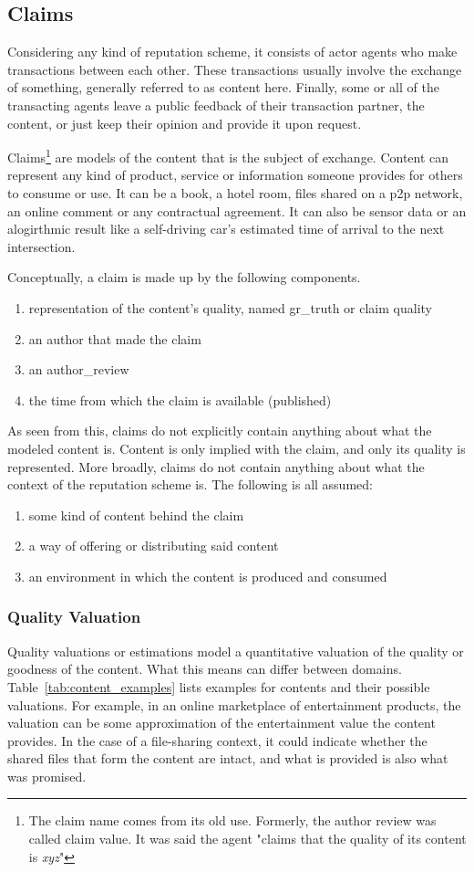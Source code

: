 \documentclass[%
    ]{\PathToTumTemplate/thesis/tum_thesis}
\begin{document}
\subsection{Claims}
Considering any kind of reputation scheme, it consists of actor agents who make transactions between each other.
These transactions usually involve the exchange of something, generally referred to as content here.
Finally, some or all of the transacting agents leave a public feedback of their transaction partner, the content, or just keep their opinion and provide it upon request.

Claims\footnote{The claim name comes from its old use. Formerly, the author review was called claim value. It was said the agent "claims that the quality of its content is \emph{xyz}"} are models of the content that is the subject of exchange.
Content can represent any kind of product, service or information someone provides for others to consume or use.
It can be a book, a hotel room, files shared on a \acrlong{p2p} network, an online comment or any contractual agreement.
It can also be sensor data or an alogirthmic result like a self-driving car's estimated time of arrival to the next intersection.

Conceptually, a claim is made up by the following components.
\begin{enumerate}
	\item representation of the content's quality, named \gls{gr_truth} or claim quality
	\item an author that made the claim
	\item an \gls{author_review}
	\item the time from which the claim is available (published)
\end{enumerate}

As seen from this, claims do not explicitly contain anything about what the modeled content is.
Content is only implied with the claim, and only its quality is represented.
More broadly, claims do not contain anything about what the context of the reputation scheme is.
The following is all assumed:
\begin{enumerate}
	\item some kind of content behind the claim
	\item a way of offering or distributing said content
	\item an environment in which the content is produced and consumed
\end{enumerate}

\subsubsection{Quality Valuation}
Quality valuations or estimations model a quantitative valuation of the quality or goodness of the content.
What this means can differ between domains.
Table~\ref{tab:content_examples} lists examples for contents and their possible valuations.
For example, in an online marketplace of entertainment products, the valuation can be some approximation of the entertainment value the content provides.
In the case of a file-sharing context, it could indicate whether the shared files that form the content are intact, and what is provided is also what was promised.
\end{document}
